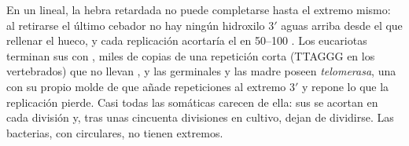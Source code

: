 \begin{proposition}\label{prop:b1:replication-mitosis:telomerase}
En un  lineal, la hebra retardada no puede completarse hasta el
extremo mismo: al retirarse el último cebador no hay ningún hidroxilo $3'$
aguas arriba desde el que rellenar el hueco, y cada replicación acortaría el
 en \qtyrange{50}{100}{} . Los eucariotas terminan sus
 con \emph{}, miles de copias de una repetición corta
(TTAGGG en los vertebrados) que no llevan , y las  germinales y
las  madre poseen \emph{telomerasa}, una  con su propio molde
de  que añade repeticiones al extremo $3'$ y repone lo que la replicación
pierde. Casi todas las  somáticas carecen de ella: sus  se
acortan en cada división y, tras unas cincuenta divisiones en cultivo, dejan
de dividirse. Las bacterias, con  circulares, no tienen extremos.
\end{proposition}

